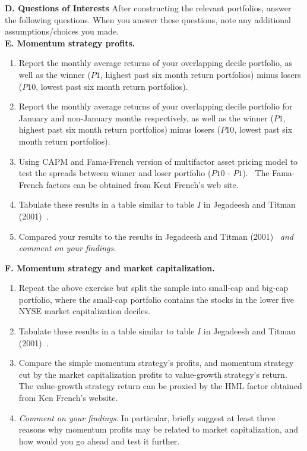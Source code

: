 \textbf{D. Questions of Interests}
After constructing the relevant portfolios, answer the following questions. When you answer these questions, note any additional assumptions/choices you made. \\


\textbf{E. Momentum strategy profits.}
	\begin{enumerate}
	\item Report the monthly average returns of your overlapping decile portfolio, as well as the winner ($P1$, highest past six month return portfolios) minus losers ($P10$, lowest past six month return portfolios).
	\item Report the monthly average returns of your overlapping decile portfolio for January and non-January months respectively, as well as the winner ($P1$, highest past six month return portfolios) minus losers ($P10$, lowest past six month return portfolios).
	\item Using CAPM and Fama-French version of multifactor asset pricing model to test the spreads between winner and loser portfolio ($P10$ - $P1$). \ The Fama-French factors can be obtained from Kent French's web site.
	\item Tabulate these results in a table similar to table $I$ in Jegadeesh and Titman (2001)~\cite{JeTi}.
	\item Compared your results to the results in Jegadeesh and Titman (2001)~\cite{JeTi} \emph{and comment on your findings.} \\
	\end{enumerate}

\textbf{F. Momentum strategy and market capitalization.}
	\begin{enumerate}
	\item Repeat the above exercise but split the sample into small-cap and big-cap portfolio, where the small-cap portfolio contains the stocks in the lower five NYSE market capitalization deciles.
	\item Tabulate these results in a table similar to table $I$ in Jegadeesh
and Titman (2001)~\cite{}.
	\item Compare the simple momentum strategy's profits, and momentum strategy cut by the market capitalization profits to value-growth strategy's return. The value-growth strategy return can be proxied by the HML factor obtained from Ken French's website.
	\item \emph{Comment on your findings}. In particular, briefly suggest at least three reasons why momentum profits may be related to market capitalization, and how would you go ahead and test it further.
	\end{enumerate}








